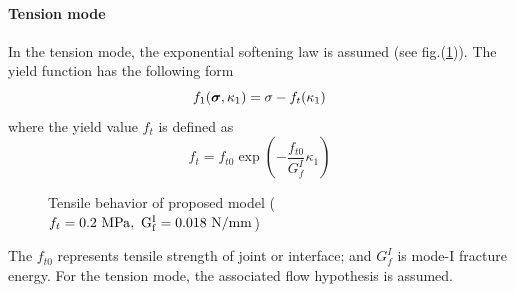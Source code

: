 \documentclass[epsf,a4paper]{article}
\newcommand{\mbf}[1]{\mbox{\boldmath$#1$}}
\newcommand{\del}[2]{\mbox{$\displaystyle\frac{#1}{#2}$}}
\newcommand{\sig}{\mbf{\sigma}}
\begin{document}
\paragraph{Tension mode}
In the tension mode, the exponential softening law is assumed (see fig.(\ref{tensfig})). The yield function has the following form
\begin{equation}
  f_1(\sig,\kappa_1) = \sigma-f_t(\kappa_1)
\end{equation}
where the yield value $f_t$ is defined as
\begin{equation}
\label{ft}
  f_t=f_{t0}\exp\left(-\del{f_{t0}}{G^I_f}\kappa_1\right)
\end{equation}
\begin{figure}
  \centerline{}
  \caption{Tensile behavior of proposed model ($f_t=0.2\ \rm{MPa},\ G_f^I=0.018\ \rm{N/mm}$)}
  \label{tensfig}
\end{figure}
The $f_{t0}$ represents tensile strength of joint or interface; and $G^I_f$ is mode-I fracture energy. For the tension mode, the associated flow hypothesis is assumed. 
\end{document}
